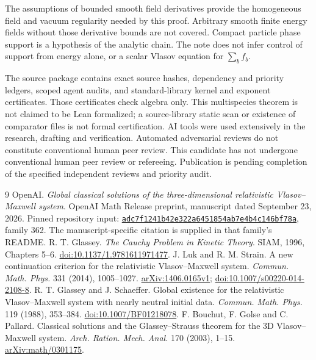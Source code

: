 \documentclass[11pt]{article}
\theoremstyle{remark}\newtheorem{remark}[theorem]{Remark}
\numberwithin{equation}{section}
\begin{document}
The assumptions of bounded smooth field derivatives provide the homogeneous
field and vacuum regularity needed by this proof. Arbitrary smooth finite
energy fields without those derivative bounds are not covered. Compact
particle phase support is a hypothesis of the analytic chain. The note
does not infer control of support from energy alone, or a scalar Vlasov
equation for $\sum_b f_b$.

The source package contains exact source hashes, dependency and priority
ledgers, scoped agent audits, and standard-library kernel and exponent
certificates. Those certificates check algebra only. This multispecies
theorem is not claimed to be Lean formalized; a source-library static scan
or existence of comparator files is not formal certification.
AI tools were used extensively in the research, drafting and verification.
Automated adversarial reviews do not constitute conventional human peer
review. This candidate has not undergone conventional human peer review or
refereeing. Publication is pending completion of the specified independent
reviews and priority audit.

\begin{thebibliography}{9}
 OpenAI.
\emph{Global classical solutions of the three-dimensional relativistic
Vlasov--Maxwell system}. OpenAI Math Release preprint, manuscript dated
September 23, 2026. Pinned repository input:
\href{https://github.com/openai/math/tree/adc7f1241b42e322a6451854ab7e4b4c146bf78a}{\texttt{adc7f1241b42e322a6451854ab7e4b4c146bf78a}}, family 362.
The manuscript-specific citation is supplied in that family's README.
 R. T. Glassey. \emph{The Cauchy Problem in Kinetic Theory}.
SIAM, 1996, Chapters 5--6. \href{https://doi.org/10.1137/1.9781611971477}{doi:10.1137/1.9781611971477}.
 J. Luk and R. M. Strain.
A new continuation criterion for the relativistic Vlasov--Maxwell system.
\emph{Commun. Math. Phys.} 331 (2014), 1005--1027.
\href{https://arxiv.org/abs/1406.0165v1}{arXiv:1406.0165v1};
\href{https://doi.org/10.1007/s00220-014-2108-8}{doi:10.1007/s00220-014-2108-8}.
 R. T. Glassey and J. Schaeffer.
Global existence for the relativistic Vlasov--Maxwell system with nearly
neutral initial data. \emph{Commun. Math. Phys.} 119 (1988), 353--384.
\href{https://doi.org/10.1007/BF01218078}{doi:10.1007/BF01218078}.
 F. Bouchut, F. Golse and C. Pallard.
Classical solutions and the Glassey--Strauss theorem for the 3D
Vlasov--Maxwell system. \emph{Arch. Ration. Mech. Anal.} 170 (2003), 1--15.
\href{https://arxiv.org/abs/math/0301175}{arXiv:math/0301175}.
\end{thebibliography}
\end{document}
